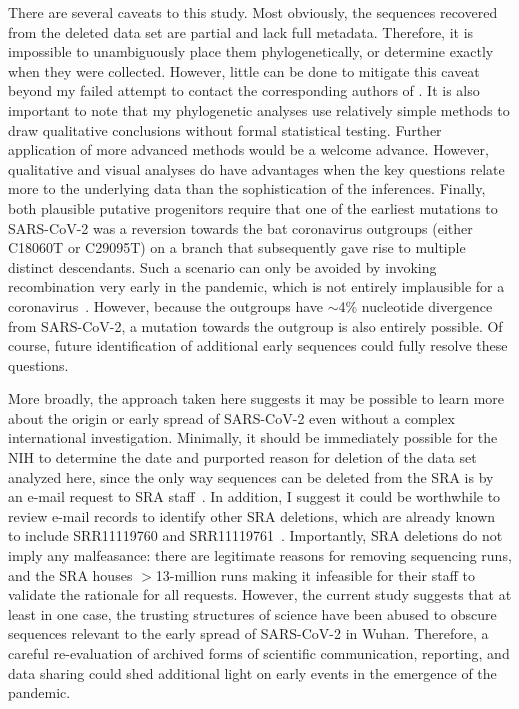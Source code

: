 \documentclass[9pt,twocolumn,twoside]{gsajnl_modified}
\begin{document}
There are several caveats to this study.
Most obviously, the sequences recovered from the deleted data set are partial and lack full metadata.
Therefore, it is impossible to unambiguously place them phylogenetically, or determine exactly when they were collected.
However, little can be done to mitigate this caveat beyond my failed attempt to contact the corresponding authors of \citet{wang2020medRxiv}.
It is also important to note that my phylogenetic analyses use relatively simple methods to draw qualitative conclusions without formal statistical testing.
Further application of more advanced methods would be a welcome advance.
However, qualitative and visual analyses do have advantages when the key questions relate more to the underlying data than the sophistication of the inferences.
Finally, both plausible putative progenitors require that one of the earliest mutations to SARS-CoV-2 was a reversion towards the bat coronavirus outgroups (either C18060T or C29095T) on a branch that subsequently gave rise to multiple distinct descendants.
Such a scenario can only be avoided by invoking recombination very early in the pandemic, which is not entirely implausible for a coronavirus~\citep{boni2020evolutionary}.
However, because the outgroups have $\sim$4\% nucleotide divergence from SARS-CoV-2, a mutation towards the outgroup is also entirely possible.
Of course, future identification of additional early sequences could fully resolve these questions.

More broadly, the approach taken here suggests it may be possible to learn more about the origin or early spread of SARS-CoV-2 even without a complex international investigation.
Minimally, it should be immediately possible for the NIH to determine the date and purported reason for deletion of the data set analyzed here, since the only way sequences can be deleted from the SRA is by an e-mail request to SRA staff~\citep{SRA_deletion}.
In addition, I suggest it could be worthwhile to review e-mail records to identify other SRA deletions, which are already known to include SRR11119760 and SRR11119761~\citep{USRTK2020}.
Importantly, SRA deletions do not imply any malfeasance: there are legitimate reasons for removing sequencing runs, and the SRA houses $>$13-million runs making it infeasible for their staff to validate the rationale for all requests.
However, the current study suggests that at least in one case, the trusting structures of science have been abused to obscure sequences relevant to the early spread of SARS-CoV-2 in Wuhan.
Therefore, a careful re-evaluation of archived forms of scientific communication, reporting, and data sharing could shed additional light on early events in the emergence of the pandemic.
\end{document}

